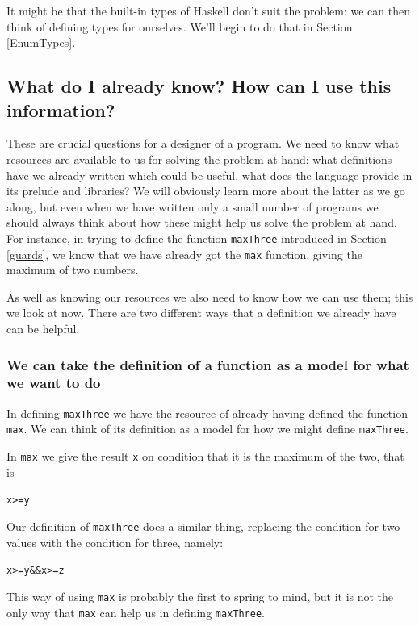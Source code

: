 It might be that the built-in types of Haskell don't suit the problem: we can then think of defining types for ourselves. We'll begin to do that in Section \ref{EnumTypes}.

\subsection*{What do I already know? How can I use this information?}

These are crucial questions for a designer of a program. We need to
know what resources are available to us for solving the problem at hand:
what definitions have we already written which could be useful, what
does the language provide in its prelude and libraries? We will
obviously learn more about the latter as we go along, but even when we
have written only
a small number of programs we should always think about how
these might help us solve the problem at hand. For instance, in trying to define the
function 
\texttt{maxThree} introduced in Section \ref{guards}, we know that we have already got the
\texttt{max} function, giving the maximum of two numbers.

As well as knowing our resources we also need to know how we can use
them; this we look at now. There are two different ways that a
definition we already have can be helpful.

\subsubsection*{We can take the {definition} {of} a function as a {\bfseries
model\/} for what we want to  do}

In defining \texttt{maxThree} we have the resource of already having defined
the function \texttt{max}. We can think of its definition as a model for how we might 
define \texttt{maxThree}.

In \texttt{max} we give the result \texttt{x} on condition that it is
the maximum of the two, that is
\begin{alltt}
x >= y
\end{alltt} 
Our definition of \texttt{maxThree} does a similar thing, replacing the condition
for two values with the condition for three, namely:
\begin{alltt}
x >= y \&\& x >= z
\end{alltt}
This way of using \texttt{max} is probably the first to spring to mind,
but it is not the only way that \texttt{max} can help us in defining
\texttt{maxThree}. 


